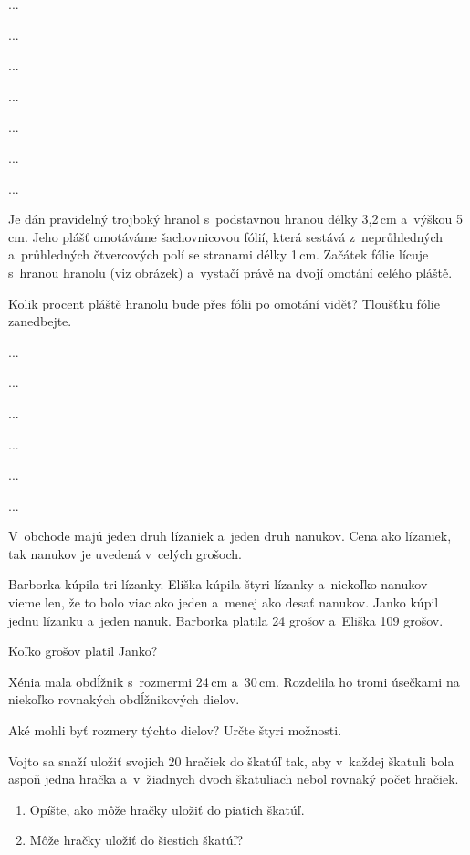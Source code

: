 {%
...}

{%
...}

{%
...}

{%
...}

{%
...}

{%
...}

{%
...}

{%
Je dán pravidelný trojboký hranol s~podstavnou hranou délky 3,2\,cm a~výškou 5\,cm.
Jeho plášť omotáváme šachovnicovou fólií, která sestává z~neprůhledných a~průhledných čtvercových polí se stranami délky 1\,cm.
Začátek fólie lícuje s~hranou hranolu (viz obrázek) a~vystačí právě na dvojí omotání celého pláště.

Kolik procent pláště hranolu bude přes fólii po omotání vidět?
Tloušťku fólie zanedbejte.
%
}

{%
...}

{%
...}

{%
...}

{%
...}

{%
...}

{%
...}

{%
V~obchode majú jeden druh lízaniek a~jeden druh nanukov.
Cena ako lízaniek, tak nanukov je uvedená v~celých grošoch.

Barborka kúpila tri lízanky.
Eliška kúpila štyri lízanky a~niekoľko nanukov -- vieme len, že to bolo viac ako jeden a~menej ako desať nanukov.
Janko kúpil jednu lízanku a~jeden nanuk.
Barborka platila 24 grošov a~Eliška 109 grošov.

Koľko grošov platil Janko?
}

{%
Xénia mala obdĺžnik s~rozmermi 24\,cm a~30\,cm.
Rozdelila ho tromi úsečkami na niekoľko rovnakých obdĺžnikových dielov.

Aké mohli byť rozmery týchto dielov? Určte štyri možnosti.
}

{%
Vojto sa snaží uložiť svojich 20 hračiek do škatúľ tak, aby v~každej škatuli bola aspoň jedna hračka a~v~žiadnych dvoch škatuliach nebol rovnaký počet hračiek.
\begin{enumerate}\alphatrue
\item Opíšte, ako môže hračky uložiť do piatich škatúľ.
\item Môže hračky uložiť do šiestich škatúľ?
\end{enumerate}
}

